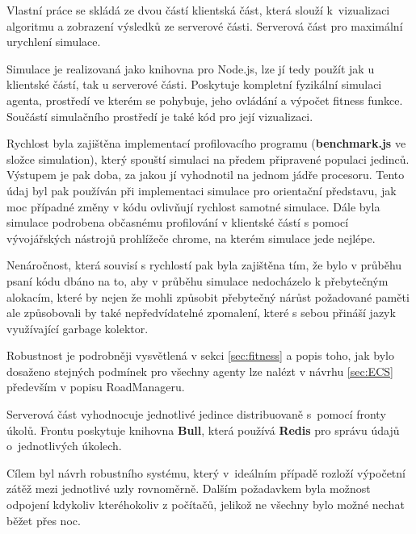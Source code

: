 



Vlastní práce se skládá ze dvou částí klientská část, která slouží k~vizualizaci algoritmu a zobrazení výsledků ze serverové části. Serverová část pro maximální urychlení simulace. 

Simulace je realizovaná jako knihovna pro Node.js, lze jí tedy použít jak u klientské částí, tak u serverové části. Poskytuje kompletní fyzikální simulaci agenta, prostředí ve kterém se pohybuje, jeho ovládání a výpočet fitness funkce. Součástí simulačního prostředí je také kód pro její vizualizaci.


Rychlost byla zajištěna implementací profilovacího programu (\textbf{benchmark.js} ve složce simulation), který spouští simulaci na předem připravené populaci jedinců. Výstupem je pak doba, za jakou jí vyhodnotil na jednom jádře procesoru. Tento údaj byl pak používán při implementaci simulace pro orientační představu, jak moc případné změny v kódu ovlivňují rychlost samotné simulace. Dále byla simulace podrobena občasnému profilování v klientské částí s pomocí vývojářských nástrojů prohlížeče chrome, na kterém simulace jede nejlépe.

Nenáročnost, která souvisí s rychlostí pak byla zajištěna tím, že bylo v průběhu psaní kódu dbáno na to, aby v průběhu simulace nedocházelo k přebytečným alokacím, které by nejen že mohli způsobit přebytečný nárůst požadované paměti ale způsobovali by také nepředvídatelné zpomalení, které s sebou přináší jazyk využívající garbage kolektor.

Robustnost je podrobněji vysvětlená v sekci \ref{sec:fitness} a popis toho, jak bylo dosaženo stejných podmínek pro všechny agenty lze nalézt v návrhu \ref{sec:ECS} především v popisu RoadManageru.

Serverová část vyhodnocuje jednotlivé jedince distribuovaně s~pomocí fronty úkolů. Frontu poskytuje knihovna \textbf{Bull}, která používá \textbf{Redis} pro správu údajů o~jednotlivých úkolech.

Cílem byl návrh robustního systému, který v~ideálním případě rozloží výpočetní zátěž mezi jednotlivé uzly rovnoměrně. Dalším požadavkem byla možnost odpojení kdykoliv kteréhokoliv z počítačů, jelikož ne všechny bylo možné nechat běžet přes noc.

\podsekce{}

